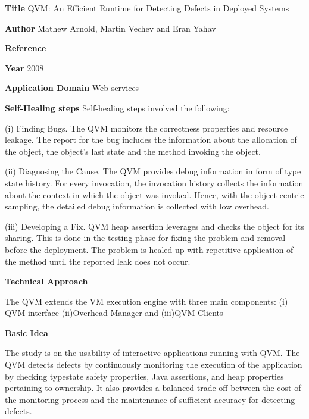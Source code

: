 \begin{compactitem}

\item[\textbf{Title}]QVM: An Efficient Runtime for Detecting Defects in Deployed Systems

\item[\textbf{Author}]
Mathew Arnold, Martin Vechev and Eran Yahav

\item[\textbf{Reference}] 

\cite{mathew_arnold_qvm:_2008}

\item[\textbf{Year}] 2008

\item[\textbf{Application Domain}]
Web services

\item[\textbf{Self-Healing steps}] Self-healing steps involved the following:

(i)	Finding Bugs.
The QVM monitors the correctness properties and resource leakage. The report for the bug includes the information about the allocation of the object, the object’s last state and the method invoking the object.

(ii) Diagnosing the Cause.
The QVM provides debug information in form of type state history. For every invocation, the invocation history collects the information about the context in which the object was invoked. Hence, with the object-centric sampling, the detailed debug information is collected with low overhead.

(iii)	Developing a Fix.
QVM heap assertion leverages and checks the object for its sharing. This is done in the testing phase for fixing the problem and removal before the deployment. The problem is healed up with repetitive application of the method until the reported leak does not occur.    

\item[\textbf{Technical Approach}]

The QVM extends the VM execution engine with three main components: 
(i)	QVM interface
(ii)Overhead Manager and
(iii)QVM Clients 

\item[\textbf{Basic Idea}]  

The study is on the usability of interactive applications running with QVM. The QVM detects defects by continuously monitoring the execution of the application by checking typestate safety properties, Java assertions, and heap properties pertaining to ownership. It also provides a balanced trade-off between the cost of the monitoring process and the maintenance of sufficient accuracy for detecting defects.


\end{compactitem}
